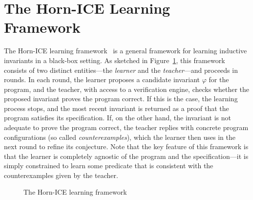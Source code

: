 
\section{The Horn-ICE Learning Framework}
\label{sec:horn-ICE}

The Horn-ICE learning framework~\cite{DBLP:conf/tacas/ChampionC0S18,DBLP:journals/pacmpl/EzudheenND0M18} is a general framework for learning inductive invariants in a black-box setting.
As sketched in Figure~\ref{fig:horn-ice-learning}, this framework consists of two distinct entities---the \emph{learner} and the \emph{teacher}---and proceeds in rounds.
In each round, the learner proposes a candidate invariant $\varphi$ for the program, and the teacher, with access to a verification engine, checks whether the proposed invariant proves the program correct. 
If this is the case, the learning process stops, and the most recent invariant is returned as a proof that the program satisfies its specification.
If, on the other hand, the invariant is not adequate to prove the program correct, the teacher replies with concrete program configurations (so called \emph{counterexamples}), which the learner then uses in the next round to refine its conjecture.
Note that the key feature of this framework is that the learner is completely agnostic of the program and the specification---it is simply constrained to learn some predicate that is consistent with the counterexamples given by the teacher.

\begin{figure}[th]
    \centering
    \caption{The Horn-ICE learning framework~\cite{DBLP:conf/tacas/ChampionC0S18,DBLP:journals/pacmpl/EzudheenND0M18}}
    \label{fig:horn-ice-learning}
\end{figure}

